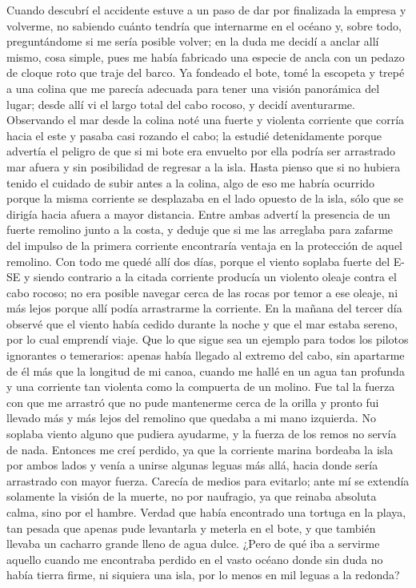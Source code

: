 \documentclass{novela}
\begin{document}
    Cuando descubrí el accidente estuve a un paso de dar por finalizada la empresa y volverme, no sabiendo cuánto tendría que internarme en el océano y, sobre todo, preguntándome si me sería posible volver; en la duda me decidí a anclar allí mismo, cosa simple, pues me había fabricado una especie de ancla con un pedazo de cloque roto que traje del barco.
    Ya fondeado el bote, tomé la escopeta y trepé a una colina que me parecía adecuada para tener una visión panorámica del lugar; desde allí vi el largo total del cabo rocoso, y decidí aventurarme.
    Observando el mar desde la colina noté una fuerte y violenta corriente que corría hacia el este y pasaba casi rozando el cabo; la estudié detenidamente porque advertía el peligro de que si mi bote era envuelto por ella podría ser arrastrado mar afuera y sin posibilidad de regresar a la isla. Hasta pienso que si no hubiera tenido el cuidado de subir antes a la colina, algo de eso me habría ocurrido porque la misma corriente se desplazaba en el lado opuesto de la isla, sólo que se dirigía hacia afuera a mayor distancia. Entre ambas advertí la presencia de un fuerte remolino junto a la costa, y deduje que si me las arreglaba para zafarme del impulso de la primera corriente encontraría ventaja en la protección de aquel remolino.
    Con todo me quedé allí dos días, porque el viento soplaba fuerte del E-SE y siendo contrario a la citada corriente producía un violento oleaje contra el cabo rocoso; no era posible navegar cerca de las rocas por temor a ese oleaje, ni más lejos porque allí podía arrastrarme la corriente.
    En la mañana del tercer día observé que el viento había cedido durante la noche y que el mar estaba sereno, por lo cual emprendí viaje. Que lo que sigue sea un ejemplo para todos los pilotos ignorantes o temerarios: apenas había llegado al extremo del cabo, sin apartarme de él más que la longitud de mi canoa, cuando me hallé en un agua tan profunda y una corriente tan violenta como la compuerta de un molino. Fue tal la fuerza con que me arrastró que no pude mantenerme cerca de la orilla y pronto fui llevado más y más lejos del remolino que quedaba a mi mano izquierda. No soplaba viento alguno que pudiera ayudarme, y la fuerza de los remos no servía de nada. Entonces me creí perdido, ya que la corriente marina bordeaba la isla por ambos lados y venía a unirse algunas leguas más allá, hacia donde sería arrastrado con mayor fuerza. Carecía de medios para evitarlo; ante mí se extendía solamente la visión de la muerte, no por naufragio, ya que reinaba absoluta calma, sino por el hambre. Verdad que había encontrado una tortuga en la playa, tan pesada que apenas pude levantarla y meterla en el bote, y que también llevaba un cacharro grande lleno de agua dulce. ¿Pero de qué iba a servirme aquello cuando me encontraba perdido en el vasto océano donde sin duda no había tierra firme, ni siquiera una isla, por lo menos en mil leguas a la redonda?
\end{document}
